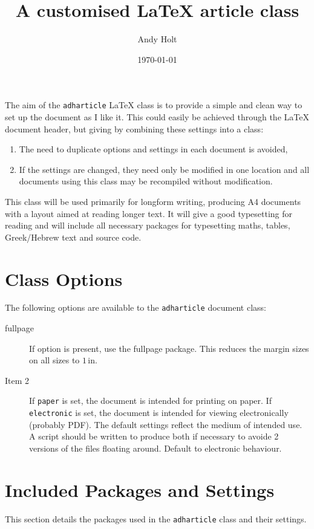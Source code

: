 \documentclass{adharticle}  %
\title{A customised \LaTeX{} article class}
\author{Andy Holt}
\date{\today}
\begin{document}
\maketitle

\noindent
The aim of the \texttt{adharticle} \LaTeX{} class is to provide a
simple and clean way to set up the document as I like it. This could easily be
achieved through the \LaTeX{} document header, but giving by combining these
settings into a class:
\begin{enumerate}
\item The need to duplicate options and settings in each document is avoided,
\item If the settings are changed, they need only be modified in one location
  and all documents using this class may be recompiled without modification.
\end{enumerate}

This class will be used primarily for longform writing, producing A4 documents
with a layout aimed at reading longer text. It will give a good typesetting for
reading and will include all necessary packages for typesetting maths, tables,
Greek/Hebrew text and source code.

\section{Class Options}

The following options are available to the \texttt{adharticle} document class:
\begin{description}
\item[fullpage] If  option is present, use the fullpage
  package. This reduces the margin sizes on all sizes to $1\,\mathrm{in}$.
\item[Item 2] If \texttt{paper} is set, the document is intended for printing on
  paper. If \texttt{electronic} is set, the document is intended for viewing
  electronically (probably PDF). The default settings reflect the medium of
  intended use. A script should be written to produce both if necessary to
  avoide 2 versions of the files floating around. Default to electronic behaviour.
\end{description}


\section{Included Packages and Settings}

This section details the packages used in the \texttt{adharticle} class and
their settings.
\end{document}
